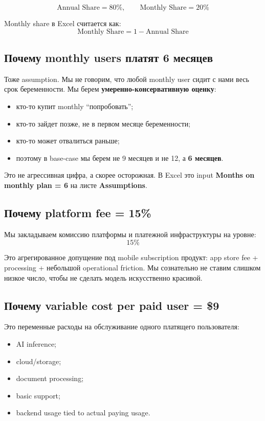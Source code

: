 \documentclass[10pt,a4paper]{article}
\begin{document}
\[
\text{Annual Share} = 80\%, \qquad \text{Monthly Share} = 20\%
\]

Monthly share в Excel считается как:
\[
\text{Monthly Share} = 1 - \text{Annual Share}
\]

\subsection{Почему monthly users платят 6 месяцев}

Тоже assumption. Мы не говорим, что любой monthly user сидит с нами весь срок беременности. Мы берем \textbf{умеренно-консервативную оценку}:

\begin{itemize}
    \item кто-то купит monthly ``попробовать'';
    \item кто-то зайдет позже, не в первом месяце беременности;
    \item кто-то может отвалиться раньше;
    \item поэтому в base-case мы берем не 9 месяцев и не 12, а \textbf{6 месяцев}.
\end{itemize}

Это не агрессивная цифра, а скорее осторожная.  
В Excel это input \textbf{Months on monthly plan = 6} на листе \textbf{Assumptions}.

\subsection{Почему platform fee = 15\%}

Мы закладываем комиссию платформы и платежной инфраструктуры на уровне:
\[
15\%
\]

Это агрегированное допущение под mobile subscription продукт: app store fee + processing + небольшой operational friction. Мы сознательно не ставим слишком низкое число, чтобы не сделать модель искусственно красивой.

\subsection{Почему variable cost per paid user = \$9}

Это переменные расходы на обслуживание одного платящего пользователя:

\begin{itemize}
    \item AI inference;
    \item cloud/storage;
    \item document processing;
    \item basic support;
    \item backend usage tied to actual paying usage.
\end{itemize}
\end{document}
